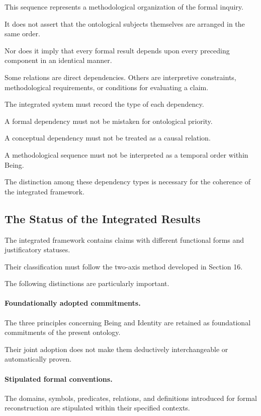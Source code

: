 This sequence represents
a methodological organization
of the formal inquiry.

It does not assert
that the ontological
subjects themselves
are arranged in
the same order.

Nor does it imply
that every formal
result depends upon
every preceding component
in an identical manner.

Some relations are
direct dependencies.
Others are interpretive
constraints, methodological
requirements, or conditions
for evaluating a claim.

The integrated system
must record the type
of each dependency.

A formal dependency
must not be mistaken
for ontological priority.

A conceptual dependency
must not be treated
as a causal relation.

A methodological sequence
must not be interpreted
as a temporal order
within Being.

The distinction among
these dependency types
is necessary for
the coherence of
the integrated framework.

\subsection{The Status of the Integrated Results}

The integrated framework
contains claims with
different functional forms
and justificatory statuses.

Their classification
must follow the
two-axis method
developed in Section 16.

The following distinctions
are particularly important.

\paragraph{Foundationally adopted commitments.}

The three principles
concerning Being
and Identity are
retained as foundational
commitments of the
present ontology.

Their joint adoption
does not make
them deductively
interchangeable or
automatically proven.

\paragraph{Stipulated formal conventions.}

The domains, symbols,
predicates, relations,
and definitions introduced
for formal reconstruction
are stipulated within
their specified contexts.

